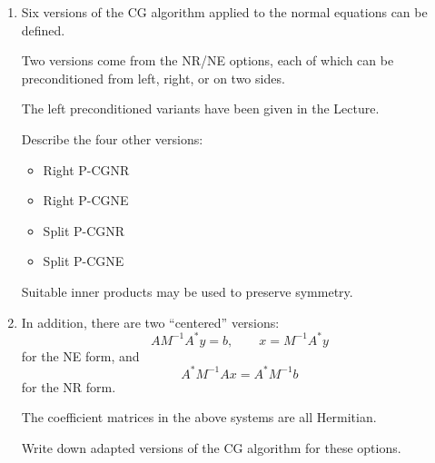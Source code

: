 \documentclass{ctexart}
\begin{document}
\begin{problem}\label{pro:7}
  \begin{enumerate}[label=(\alph*)]

    \item
      Six versions of the CG algorithm applied to the normal equations can be defined.

      Two versions come from the NR/NE options, each of which can be preconditioned from left, right, or on two sides.

      The left preconditioned variants have been given in the Lecture.

      Describe the four other versions:

      \begin{itemize}
        \item Right P-CGNR
        \item Right P-CGNE
        \item Split P-CGNR
        \item Split P-CGNE
      \end{itemize}

      Suitable inner products may be used to preserve symmetry.

    \item
      In addition, there are two ``centered'' versions:
      \[
        AM^{-1}A^*y=b,
        \qquad
        x=M^{-1}A^*y
      \]
      for the NE form, and
      \[
        A^*M^{-1}Ax=A^*M^{-1}b
      \]
      for the NR form.

      The coefficient matrices in the above systems are all Hermitian.

      Write down adapted versions of the CG algorithm for these options.

  \end{enumerate}
\end{problem}
\end{document}
